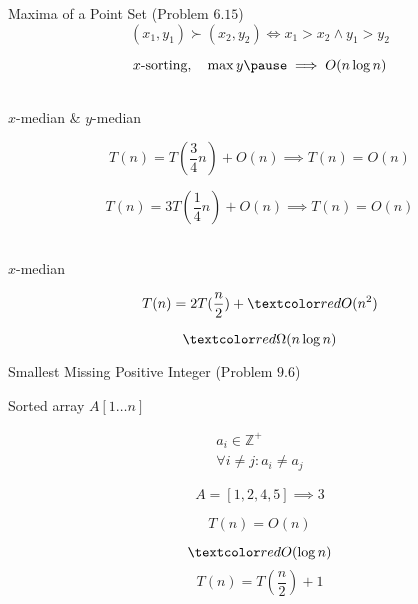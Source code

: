 \begin{frame}{}
  \begin{exampleblock}{Maxima of a Point Set (Problem $6.15$)}
    \[
      (x_1, y_1) \succ (x_2, y_2) \iff x_1 > x_2 \land y_1 > y_2
    \]
  \end{exampleblock}

  \pause
  \[
    x\text{-sorting}, \quad \max y \pause \implies O(n \log n)
  \]
\end{frame}

\begin{frame}{}
  \begin{center}
     \\[6pt]

    $x$-median \& $y$-median
  \end{center}

  \[
    T(n) = T(\frac{3}{4} n) + O(n) \implies T(n) = O(n)
  \]

  \[
    T(n) = 3T(\frac{1}{4} n) + O(n) \implies T(n) = O(n)
  \]
\end{frame}

\begin{frame}{}
  \begin{center}
      \\[6pt]

    $x$-median
  \end{center}

  \pause
  \[
    T(n) = 2T(\frac{n}{2}) + \red{O(n^2)}
  \]

  \pause
  \[
    \red{\Omega(n \log n)}
  \]
\end{frame}

\begin{frame}{}
  \begin{exampleblock}{Smallest Missing Positive Integer (Problem $9.6$)}
    \centerline{Sorted array $A[1 \ldots n]$}

    \vspace{-0.50cm}
    \begin{gather*}
      a_i \in \mathbb{Z}^{+} \\
      \forall i \neq j: a_i \neq a_j
    \end{gather*}

    \vspace{-0.30cm}
    \[
      A = [1,2,4,5] \implies 3
    \]
  \end{exampleblock}

  \pause
  \[
    T(n) = O(n)
  \]

  \pause
  \[
    \red{O(\log n)}
  \]
  \pause
  \[
    T(n) = T(\frac{n}{2}) + 1
  \]
\end{frame}

